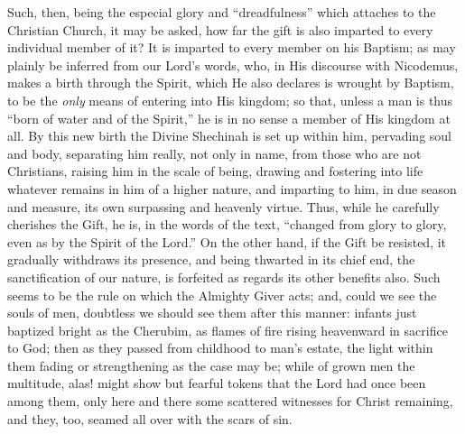 Such, then, being the especial glory and ``dreadfulness''
which attaches to the Christian Church, it may be asked, how far the
gift is also imparted to every individual member of it? It is imparted
to every member on his Baptism; as may plainly be inferred from our
Lord's words, who, in His discourse with Nicodemus, makes a birth
through the Spirit, which He also declares is wrought by Baptism, to
be the \emph{only} means of entering into His kingdom; so that, unless
a man is thus ``born of water and of the Spirit,'' he is in no
sense a member of His kingdom at all. By this new birth the Divine
Shechinah is set up within him, pervading soul and body, separating
him really, not only in name, from those who are not Christians,
raising him in the scale of being, drawing and fostering into life
whatever remains in him of a higher nature, and imparting to him, in
due season and measure, its own surpassing and heavenly virtue. Thus,
while he carefully cherishes the Gift, he is, in the words of the
text, ``changed from glory to glory, even as by the Spirit of the
Lord.'' On the other hand, if the Gift be resisted, it gradually
withdraws its presence, and being thwarted in its chief end, the
sanctification of our nature, is forfeited as regards its other
benefits also. Such seems to be the rule on which the Almighty Giver
acts; and, could we see the souls of men, doubtless we should see them
after this manner: infants just baptized bright as the Cherubim, as
flames of fire rising heavenward in sacrifice to God; then as they
passed from childhood to man's estate, the light within them fading
or strengthening as the case may be; while of grown men the multitude,
alas! might show but fearful tokens that the Lord had once been among
them, only here and there some scattered witnesses for Christ
remaining, and they, too, seamed all over with the scars of sin.

